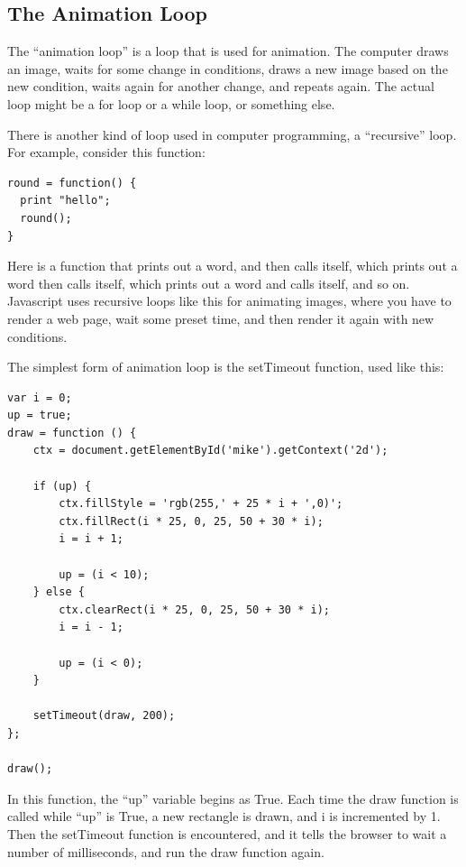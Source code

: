 \documentclass[11pt]{article}
\begin{document}
\subsection{The Animation Loop}

The ``animation loop'' is a loop that is used for animation.  The
computer draws an image, waits for some change in conditions, draws a
new image based on the new condition, waits again for another change,
and repeats again.  The actual loop might
be a for loop or a while loop, or something else.

There is another kind of loop used in computer programming, a
``recursive'' loop.  For example, consider this function:

\begin{verbatim}
round = function() {
  print "hello";
  round();
}
\end{verbatim}

Here is a function that prints out a word, and then calls itself,
which prints out a word then calls itself, which prints out a word and
calls itself, and so on.  Javascript uses recursive loops like this
for animating images, where you have to render a web page, wait some
preset time, and then render it again with new conditions.

The simplest form of animation loop is the setTimeout function, used
like this:

\begin{verbatim}
var i = 0;
up = true;
draw = function () {
    ctx = document.getElementById('mike').getContext('2d');

    if (up) {
        ctx.fillStyle = 'rgb(255,' + 25 * i + ',0)';
        ctx.fillRect(i * 25, 0, 25, 50 + 30 * i);
        i = i + 1;

        up = (i < 10);
    } else {
        ctx.clearRect(i * 25, 0, 25, 50 + 30 * i);
        i = i - 1;

        up = (i < 0);
    }

    setTimeout(draw, 200);
};

draw();
\end{verbatim}

In this function, the ``up'' variable begins as True.  Each time the
draw function is called while ``up'' is True, a new rectangle is
drawn, and i is incremented by 1.  Then the setTimeout function is
encountered, and it tells the browser to wait a number of
milliseconds, and run the draw function again.
\end{document}
